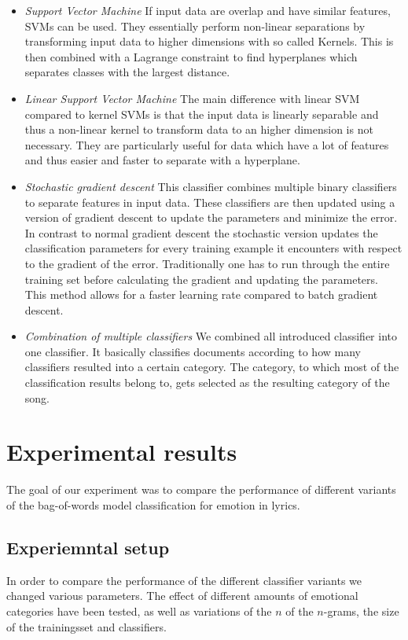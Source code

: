 \documentclass[a4paper,12pt]{article}
\begin{document}
\begin{itemize}
\item \textit{Support Vector Machine}
If input data are overlap and have similar features, SVMs can be used. They essentially perform non-linear separations by transforming input data to higher dimensions with so called Kernels. This is then combined with a Lagrange constraint to find hyperplanes which separates classes with the largest distance. 


\item \textit{Linear Support Vector Machine}
The main difference with linear SVM compared to kernel SVMs is that the  input data is linearly separable and thus a non-linear kernel to transform data to an higher dimension is not necessary. They are particularly useful for data which have a lot of features and thus easier and faster to separate with a hyperplane.

\item \textit{Stochastic gradient descent}
This classifier combines multiple binary classifiers to separate features in input data. These classifiers are then updated using a version of gradient descent to update the parameters and minimize the error. In contrast to normal gradient descent the stochastic version updates the classification parameters for every training example it encounters with respect to the gradient of the error. Traditionally one has to run through the entire training set before calculating the gradient and updating the parameters. This method allows for a faster learning rate compared to batch gradient descent.

\item \textit{Combination of multiple classifiers} We combined all introduced classifier into one classifier. It basically classifies documents according to how many classifiers resulted into a certain category. The category, to which most of the classification results belong to, gets selected as the resulting category of the song.
\end{itemize}

\section{Experimental results}
\label{sec:exps}
The goal of our experiment was to compare the performance of different variants of the bag-of-words model classification for emotion in lyrics. 
 

\subsection{Experiemntal setup}
In order to compare the performance of the different classifier variants we changed various parameters. The effect of different amounts of emotional categories have been tested, as well as variations of the $n$ of the $n$-grams, the size of the trainingsset and classifiers.
\end{document}
